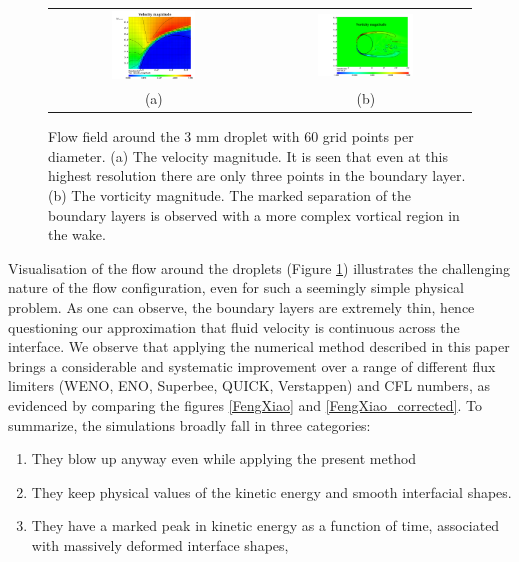 \begin{figure}[!h]
\begin{center}
\begin{tabular}{cc}
\includegraphics[width=0.42\textwidth]{Figures/vel.png}
& \includegraphics[width=0.48\textwidth]{Figures/vort.png} \\
(a) & (b)
\end{tabular}
\end{center}
\caption{Flow field around the 3 mm droplet with 60 grid points per diameter. 
(a) The velocity magnitude. It is seen that even at this highest resolution 
there are only three points in the boundary layer. (b) The vorticity magnitude. 
The marked separation of the boundary layers is observed with 
a more complex vortical region in the wake.}
\label{magn}
\end{figure}
\newcommand\DDD{{\cal D}}

Visualisation of the flow around the droplets (Figure \ref{magn}) illustrates the challenging nature of the flow configuration, even for such a seemingly simple physical problem. As one can observe, the boundary layers are extremely thin, hence questioning our approximation that fluid velocity is continuous across the interface. We observe that applying the numerical method described in this paper brings a considerable and systematic improvement over a range of different flux limiters (WENO, ENO, Superbee, QUICK, Verstappen) and CFL numbers, as evidenced by comparing the figures \ref{FengXiao} and \ref{FengXiao_corrected}. To summarize, the simulations broadly fall in three categories: 

\begin{enumerate}
	\item They blow up anyway even while applying the present method
	\item They keep physical values of the kinetic energy and smooth interfacial shapes.
	\item They have a marked peak in kinetic energy as a function of time, associated with massively deformed interface shapes, 
\end{enumerate}

